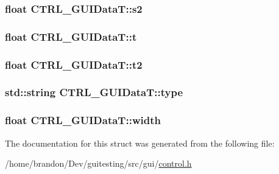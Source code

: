 \hypertarget{struct_c_t_r_l___g_u_i_data_t_489d37cf911ba0757d0fddf3a8ceac33}{
\subsubsection[{s2}]{\setlength{\rightskip}{0pt plus 5cm}float {\bf CTRL\_\-GUIDataT::s2}}}
\label{struct_c_t_r_l___g_u_i_data_t_489d37cf911ba0757d0fddf3a8ceac33}


\hypertarget{struct_c_t_r_l___g_u_i_data_t_6ad0aba01a9c3c1520528d02bdd664a5}{
\subsubsection[{t}]{\setlength{\rightskip}{0pt plus 5cm}float {\bf CTRL\_\-GUIDataT::t}}}
\label{struct_c_t_r_l___g_u_i_data_t_6ad0aba01a9c3c1520528d02bdd664a5}


\hypertarget{struct_c_t_r_l___g_u_i_data_t_e7f81276c9a799462b5410a7758bec94}{
\subsubsection[{t2}]{\setlength{\rightskip}{0pt plus 5cm}float {\bf CTRL\_\-GUIDataT::t2}}}
\label{struct_c_t_r_l___g_u_i_data_t_e7f81276c9a799462b5410a7758bec94}


\hypertarget{struct_c_t_r_l___g_u_i_data_t_69e6d7288b802c64b16e806876913751}{
\subsubsection[{type}]{\setlength{\rightskip}{0pt plus 5cm}std::string {\bf CTRL\_\-GUIDataT::type}}}
\label{struct_c_t_r_l___g_u_i_data_t_69e6d7288b802c64b16e806876913751}


\hypertarget{struct_c_t_r_l___g_u_i_data_t_9c2d04bc9a024f24c51aef054a79c219}{
\subsubsection[{width}]{\setlength{\rightskip}{0pt plus 5cm}float {\bf CTRL\_\-GUIDataT::width}}}
\label{struct_c_t_r_l___g_u_i_data_t_9c2d04bc9a024f24c51aef054a79c219}




The documentation for this struct was generated from the following file:\begin{CompactItemize}
\item 
/home/brandon/Dev/guitesting/src/gui/\hyperlink{control_8h}{control.h}\end{CompactItemize}
